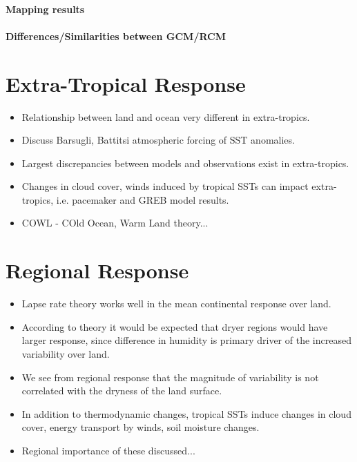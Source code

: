 \paragraph{Mapping results}
\paragraph{Differences/Similarities between GCM/RCM}





\section{Extra-Tropical Response}
\begin{itemize}
	\item Relationship between land and ocean very different in extra-tropics.
	\item Discuss Barsugli, Battitsi atmospheric forcing of SST anomalies.
	\item Largest discrepancies between models and observations exist in 
		extra-tropics.
	\item Changes in cloud cover, winds induced by tropical SSTs can impact 
		extra-tropics, i.e. pacemaker and GREB model results.
	\item COWL - COld Ocean, Warm Land theory...
\end{itemize}


\section{Regional Response}

\begin{itemize}
	\item Lapse rate theory works well in the mean continental response over 
		land.
	\item According to theory it would be expected that dryer regions would have 
		larger response, since difference in humidity is primary driver of the 
		increased variability over land.
	\item We see from regional response that the magnitude of variability is not 
		correlated with the dryness of the land surface.
	\item In addition to thermodynamic changes, tropical SSTs induce changes in 
		cloud cover, energy transport by winds, soil moisture changes.
	\item Regional importance of these discussed...
\end{itemize}


